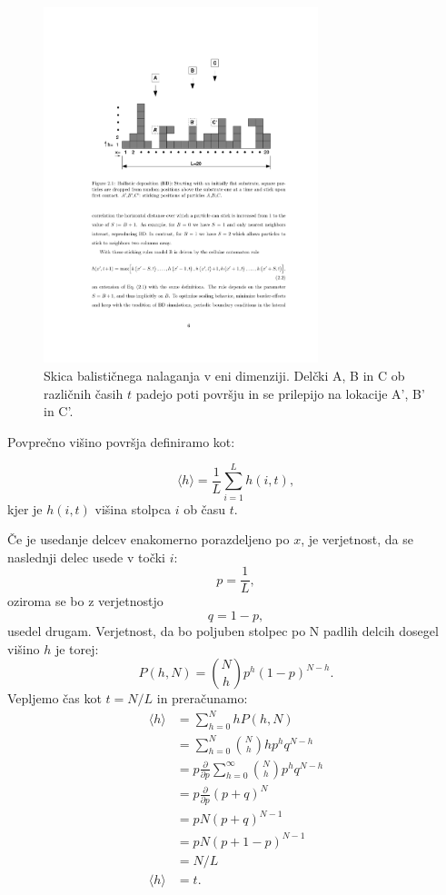 \documentclass[a4paper, twoside, 12pt]{book}
\begin{document}
    \begin{figure}[h]
      \begin{center}
        \includegraphics[width=8cm]{slike/bdep}
      \end{center}
      \caption{Skica balističnega nalaganja v eni dimenziji. Delčki A, B in C ob različnih časih $t$ padejo poti površju in se prilepijo na lokacije A’, B’ in C’.}
      \label{fig:bdep}
    \end{figure}

Povprečno višino površja definiramo kot:

  \begin{equation}
    \langle h \rangle = \frac{1}{L} \sum_{i=1}^L h(i,t),
    \label{povprecna-visina}
  \end{equation}
kjer je $h(i,t)$ višina stolpca $i$ ob času $t$.

Če je usedanje delcev enakomerno porazdeljeno po $x$, je verjetnost, da se naslednji delec usede v točki $i$:
\begin{equation}
  p = \frac{1}{L},
\end{equation}
oziroma se bo z verjetnostjo
\begin{equation}
  q = 1 - p,
\end{equation}
usedel drugam.
Verjetnost, da bo poljuben stolpec po N padlih delcih dosegel višino $h$ je torej:
\begin{equation}
  P(h,N) = \binom{N}{h} p^h (1 - p)^{N - h}.
\end{equation}
Vepljemo čas kot $t = N / L$ in preračunamo:
\begin{align}
  \langle h \rangle &= \sum_{h=0}^{N} h P(h,N) \\
  &= \sum_{h=0}^{N} \binom{N}{h} h p^h q^{N - h} \\
  &= p \frac{\partial}{\partial p} \sum_{h=0}^{\infty} \binom{N}{h} p^h q^{N - h} \\
  &= p \frac{\partial}{\partial p} (p + q)^N \\
  &= p N (p + q)^{N-1} \\
  &= p N (p + 1 - p)^{N-1} \\
  &= N / L \\
  \langle h \rangle &= t.
\end{align}
\end{document}
